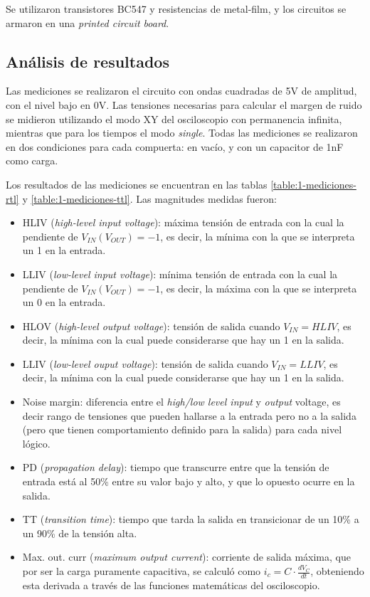 \documentclass[../../e3_tp2_main.tex]{subfiles}
\begin{document}
Se utilizaron transistores BC547 y resistencias de metal-film, y los circuitos se armaron en una \textit{printed circuit board}. \par

\subsection{An\'alisis de resultados}

Las mediciones se realizaron el circuito con ondas cuadradas de 5V de amplitud, con el nivel bajo en 0V. Las tensiones necesarias para calcular el margen de ruido se midieron utilizando el modo XY del osciloscopio con permanencia infinita, mientras que para los tiempos el modo \textit{single}. Todas las mediciones se realizaron en dos condiciones para cada compuerta: en vac\'io, y con un capacitor de 1nF como carga.\par

Los resultados de las mediciones se encuentran en las tablas \ref{table:1-mediciones-rtl} y \ref{table:1-mediciones-ttl}. Las magnitudes medidas fueron:

\begin{itemize}
	\item HLIV (\textit{high-level input voltage}): m\'axima tensi\'on de entrada con la cual la pendiente de $V_{IN}(V_{OUT})=-1$, es decir, la m\'inima con la que se interpreta un 1 en la entrada.
	\item LLIV (\textit{low-level input voltage}): m\'inima tensi\'on de entrada con la cual la pendiente de $V_{IN}(V_{OUT})=-1$, es decir, la m\'axima con la que se interpreta un 0 en la entrada.
	\item HLOV (\textit{high-level output voltage}): tensi\'on de salida cuando $V_{IN}=HLIV$, es decir, la m\'inima con la cual puede considerarse que hay un 1 en la salida.
	\item LLIV (\textit{low-level ouput voltage}): tensi\'on de salida cuando $V_{IN}=LLIV$, es decir, la m\'inima con la cual puede considerarse que hay un 1 en la salida.
	\item Noise margin: diferencia entre el \textit{high/low level input} y \textit{output} voltage, es decir rango de tensiones que pueden hallarse a la entrada pero no a la salida (pero que tienen comportamiento definido para la salida) para cada nivel l\'ogico. 
	\item PD (\textit{propagation delay}): tiempo que transcurre entre que la tensi\'on de entrada est\'a al 50\% entre su valor bajo y alto, y que lo opuesto ocurre en la salida.
	\item TT (\textit{transition time}): tiempo que tarda la salida en transicionar de un 10\% a un 90\% de la tensi\'on alta.
	\item Max. out. curr (\textit{maximum output current}): corriente de salida m\'axima, que por ser la carga puramente capacitiva, se calcul\'o como $i_c = C \cdot \frac{dV_C}{dt}$, obteniendo esta derivada a trav\'es de las funciones matem\'aticas del osciloscopio. \par
\end{itemize}
\end{document}
